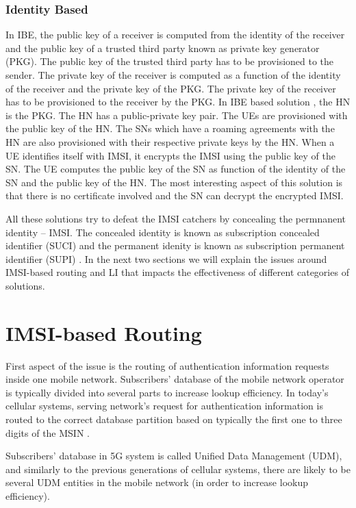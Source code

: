 \documentclass[conference]{IEEEtran}
\begin{document}
\subsubsection{Identity Based} In IBE, the public key of a receiver is computed from the identity of the receiver and the public key of a trusted third party known as private key generator (PKG). The public key of the trusted third party has to be provisioned to the sender. The private key of the receiver is computed as a function of the identity of the receiver and the private key of the PKG. The private key of the receiver has to be provisioned to the receiver by the PKG. In IBE based solution \cite{IBE_mohsin,ICTJournal}, the HN is the PKG. The HN has a public-private key pair. The UEs are provisioned with the public key of the HN. The SNs which have a roaming agreements with the HN are also provisioned with their respective private keys by the HN. When a UE identifies itself with IMSI, it encrypts the IMSI using the public key of the SN. The UE computes the public key of the SN as function of the identity of the SN and the public key of the HN. The most interesting aspect of this solution is that there is no certificate involved and the SN can decrypt the encrypted IMSI.

All these solutions try to defeat the IMSI catchers by concealing the permnanent identity -- IMSI. The concealed identity is known as subscription concealed identifier (SUCI) and the permanent idenity is known as subscription permanent identifier (SUPI) \cite{TS33501}. In the next two sections we will explain the issues around IMSI-based routing and LI that impacts the effectiveness of different categories of solutions.

\section{IMSI-based Routing} \label{section:IMSI-based-routing}
First aspect of the issue is the routing of authentication information requests inside one mobile network. Subscribers' database of the mobile network operator is typically divided into several parts to increase lookup efficiency. In today's cellular systems, serving network's request for authentication information is routed to the correct database partition based on typically the first one to three digits of the MSIN \cite{S3180761}.

Subscribers' database in 5G system is called Unified Data Management (UDM), and similarly to the previous generations of cellular systems, there are likely to be several UDM entities in the mobile network (in order to increase lookup efficiency). 
\end{document}
